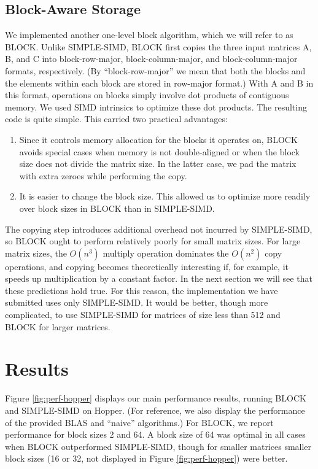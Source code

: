 \documentclass{article}
\begin{document}
\subsection{Block-Aware Storage}
We implemented another one-level block algorithm, which we will refer to as BLOCK. Unlike SIMPLE-SIMD, BLOCK first copies the three input matrices A, B, and C into block-row-major, block-column-major, and block-column-major formats, respectively.  (By ``block-row-major'' we mean that both the blocks and the elements within each block are stored in row-major format.)  With A and B in this format, operations on blocks simply involve dot products of contiguous memory.  We used SIMD intrinsics to optimize these dot products.  The resulting code is quite simple.  This carried two practical advantages:
\begin{enumerate}
  \item Since it controls memory allocation for the blocks it operates on, BLOCK avoids special cases when memory is not double-aligned or when the block size does not divide the matrix size.  In the latter case, we pad the matrix with extra zeroes while performing the copy.
  \item It is easier to change the block size.  This allowed us to optimize more readily over block sizes in BLOCK than in SIMPLE-SIMD.
\end{enumerate}

The copying step introduces additional overhead not incurred by SIMPLE-SIMD, so BLOCK ought to perform relatively poorly for small matrix sizes.  For large matrix sizes, the $O(n^3)$ multiply operation dominates the $O(n^2)$ copy operations, and copying becomes theoretically interesting if, for example, it speeds up multiplication by a constant factor.  In the next section we will see that these predictions hold true.  For this reason, the implementation we have submitted uses only SIMPLE-SIMD.  It would be better, though more complicated, to use SIMPLE-SIMD for matrices of size less than 512 and BLOCK for larger matrices.

\section{Results}
\label{sec:results}
Figure \ref{fig:perf-hopper} displays our main performance results, running BLOCK and SIMPLE-SIMD on Hopper.  (For reference, we also display the performance of the provided BLAS and ``naive'' algorithms.)  For BLOCK, we report performance for block sizes 2 and 64.  A block size of 64 was optimal in all cases when BLOCK outperformed SIMPLE-SIMD, though for smaller matrices smaller block sizes (16 or 32, not displayed in Figure \ref{fig:perf-hopper}) were better.
\end{document}
